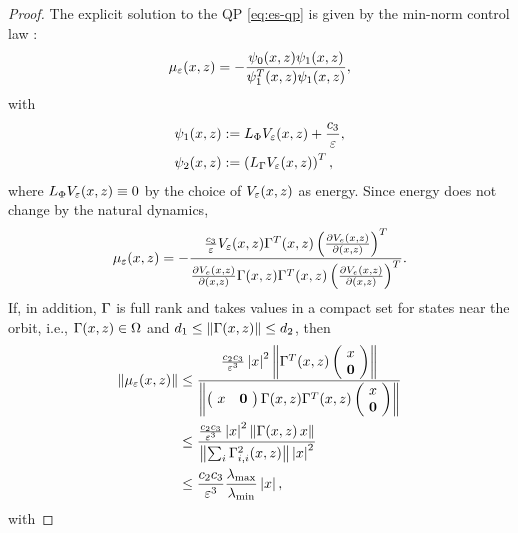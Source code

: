 \begin{proof}
  The explicit solution to the QP \eqref{eq:es-qp} is given by the min-norm control law \cite{FreeKoko}:
  \begin{align}
    \mu_{\varepsilon}(x, z) = -\frac{\psi_{0}(x, z) \psi_{1}(x, z)}{\psi_{1}^{T}(x, z) \psi_{1}(x, z)},
  \end{align}
  with
  \begin{align}
    \nonumber
    \psi_{1}(x, z) &:= L_{\Phi} V_{\varepsilon}(x, z) + \frac{c_{3}}{\varepsilon},\\
    \psi_{2}(x, z) &:= \left( L_{\Gamma} V_{\varepsilon}(x, z) \right)^{T},
  \end{align}
  where $L_{\Phi} V_{\varepsilon}(x, z) \equiv 0$ by the choice of $V_{\varepsilon}(x, z)$ as energy.
  Since energy does not change by the natural dynamics,
  \begin{align}
    \mu_{\varepsilon}(x, z) = - \frac{\frac{c_{3}}{\varepsilon} V_{\varepsilon}(x, z) \Gamma^{T}(x, z) \left( \frac{\partial{V_{e}(x, z)}}{\partial{(x, z)}} \right)^{T}}{\frac{\partial{V_{e}(x, z)}}{\partial{(x, z)}} \Gamma(x, z) \Gamma^{T}(x, z) \left( \frac{\partial{V_{e}(x, z)}}{\partial{(x, z)}} \right)^{T}}.
  \end{align}
  If, in addition, $\Gamma$ is full rank and takes values in a compact set for states near the orbit, i.e., $\Gamma(x, z) \in \Omega$ and $d_{1} \leq \| \Gamma(x, z) \| \leq d_{2}$, then
  \begin{align}
    \nonumber
    \| \mu_{\varepsilon}(x, z) \|
    &\leq \frac{\frac{c_{2}c_{3}}{\varepsilon^3} \left|x\right|^{2} \left\| \Gamma^{T}(x, z)
      \left(\!\begin{array}{c}
      x\\
      {\mathbf 0}
      \end{array}\!\right)\right\|}{\left\|
      \left(\!\begin{array}{c c}
      x & {\mathbf 0}
      \end{array}\!\right) \Gamma(x, z) \Gamma^{T}(x, z)
      \left(\!\begin{array}{c}
      x\\
      {\mathbf 0}
      \end{array}\!\right) \right\|}\\
    \nonumber
    &\leq \frac{\frac{c_{2}c_{3}}{\varepsilon^{3}} \left|x\right|^{2} \left\| \Gamma(x, z)
      \, x \right\|}{\left\|
      \sum_{i} \Gamma_{i,i}^{2}(x, z) \right\| \left|x\right|^{2}}\\
    \label{eq:mueps-bounds}
    &\leq \frac{c_{2}c_{3}}{\varepsilon^{3}} \frac{\lambda_{\mathrm{max}}}{\lambda_{\mathrm{min}}} \left|x\right|,
  \end{align}
  with

\end{proof}
